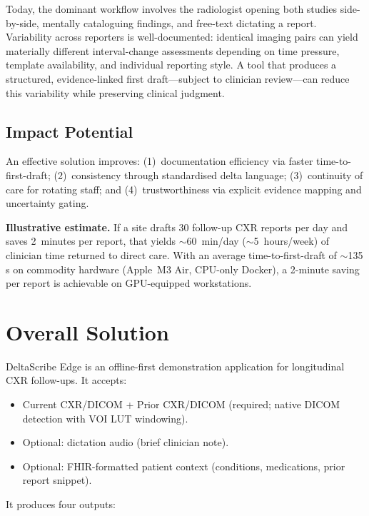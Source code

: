 \documentclass[10pt,twocolumn]{article}
\begin{document}
Today, the dominant workflow involves the radiologist opening both studies side-by-side, mentally cataloguing findings, and free-text dictating a report.
Variability across reporters is well-documented: identical imaging pairs can yield materially different interval-change assessments depending on time pressure, template availability, and individual reporting style.
A tool that produces a structured, evidence-linked first draft---subject to clinician review---can reduce this variability while preserving clinical judgment.

\subsection{Impact Potential}

An effective solution improves:
(1)~documentation efficiency via faster time-to-first-draft;
(2)~consistency through standardised delta language;
(3)~continuity of care for rotating staff; and
(4)~trustworthiness via explicit evidence mapping and uncertainty gating.

\smallskip
\noindent\textbf{Illustrative estimate.}
If a site drafts 30 follow-up CXR reports per day and saves 2~minutes per report, that yields ${\sim}$60~min/day (${\sim}$5~hours/week) of clinician time returned to direct care.
With an average time-to-first-draft of ${\sim}$135\,s on commodity hardware (Apple~M3 Air, CPU-only Docker), a 2-minute saving per report is achievable on GPU-equipped workstations.

\section{Overall Solution}

DeltaScribe Edge is an offline-first demonstration application for longitudinal CXR follow-ups.
It accepts:

\begin{itemize}
  \item Current CXR/DICOM + Prior CXR/DICOM (required; native DICOM detection with VOI LUT windowing).
  \item Optional: dictation audio (brief clinician note).
  \item Optional: FHIR-formatted patient context (conditions, medications, prior report snippet).
\end{itemize}

\noindent It produces four outputs:
\end{document}
